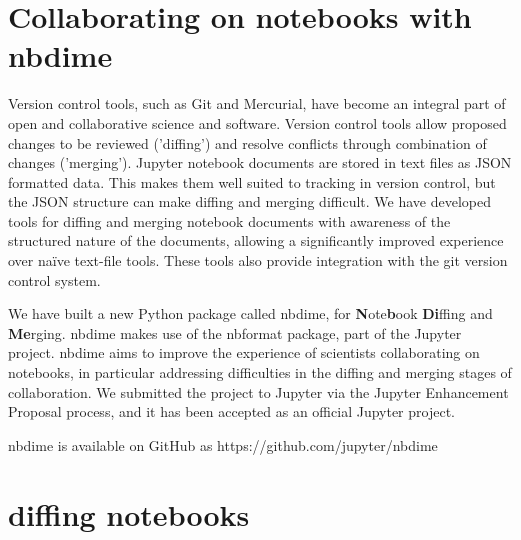 \documentclass{deliverablereport}
\author{Benjamin Ragan-Kelley \& Martin Sandve Aln\ae{}s \& Vidar Fauske}
\begin{document}
    
\maketitle
\githubissuedescription

\section{Collaborating on notebooks with nbdime}

Version control tools, such as Git and Mercurial, have become an integral part of open and
collaborative science and software. Version control tools allow proposed changes to be reviewed
('diffing') and resolve conflicts through combination of changes ('merging'). Jupyter notebook
documents are stored in text files as JSON formatted data. This makes them well suited to tracking
in version control, but the JSON structure can make diffing and merging difficult.
We have developed tools for diffing and merging notebook documents with awareness of the structured
nature of the documents, allowing a significantly improved experience over naïve text-file tools.
These tools also provide integration with the git version control system.

We have built a new Python package called nbdime, for \textbf{N}ote\textbf{b}ook \textbf{Di}ffing and \textbf{Me}rging.
nbdime makes use of the nbformat package, part of the Jupyter project.
nbdime aims to improve the experience of scientists collaborating on notebooks,
in particular addressing difficulties in the diffing and merging stages of collaboration.
We submitted the project to Jupyter via the Jupyter Enhancement Proposal process,
and it has been accepted as an official Jupyter project.

nbdime is available on GitHub as https://github.com/jupyter/nbdime

\section{diffing notebooks} %
\label{sec:diffing_notebooks}
\end{document}
